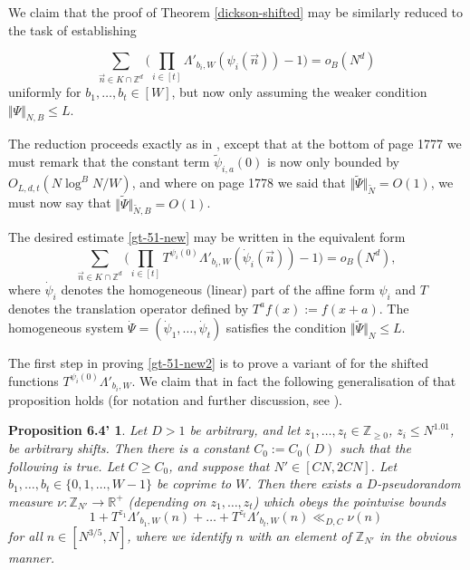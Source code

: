 \documentclass[12pt]{amsart}
\numberwithin{equation}{section}  %
\theoremstyle{remark}
\theoremstyle{plain}
\newtheorem*{prop64new}{Proposition 6.4'}
\numberwithin{equation}{section}
\newcommand{\Z}{\mathbb{Z}}
\newcommand{\R}{\mathbb{R}}
\renewcommand{\leq}{\leqslant}
\renewcommand{\geq}{\geqslant}
\renewcommand{\(}{\left(}
\renewcommand{\)}{\right)}
\newcommand{\vect}[1]{{\ensuremath{\vec{#1}}}}
\begin{document}
We claim that the proof of Theorem \ref{dickson-shifted} may be similarly reduced to the task of establishing 

\begin{equation}\label{gt-51-new} \sum_{\vect{n} \in K \cap \Z^d} \Bigg(\prod_{i \in [t]} \Lambda'_{b_i, W}(\psi_i(\vect{n})) - 1\Bigg) = o_B(N^d)\end{equation} uniformly for $b_1,\dots, b_t \in [W]$, but now only assuming the weaker condition $\Vert \Psi \Vert_{N, B} \leq L$.

The reduction proceeds exactly as in \cite[Chapter 5]{gt-linearprimes}, except that at the bottom of page 1777 we must remark that the constant term $\tilde\psi_{i,a}(0)$ is now only bounded by $O_{L,d,t}(N\log^B N/W)$, and where on page 1778 we said that $\Vert \tilde\Psi \Vert_{\tilde N} = O(1)$, we must now say that $\Vert \tilde\Psi \Vert_{\tilde N, B} = O(1)$.


The desired estimate \eqref{gt-51-new} may be written in the equivalent form
\begin{equation}\label{gt-51-new2} \sum_{\vect{n} \in K \cap \Z^d} \Bigg(\prod_{i \in [t]} T^{\psi_i(0)}\Lambda'_{b_i, W}(\dot\psi_i(\vect{n})) - 1\Bigg) = o_B(N^d),\end{equation} where $\dot\psi_i$ denotes the homogeneous (linear) part of the affine form $\psi_i$ and $T$ denotes the translation operator defined by $T^af(x) := f(x + a)$. The homogeneous system $\dot\Psi = (\dot\psi_1,\dots, \dot\psi_t)$ satisfies the condition $\Vert \tilde\Psi \Vert_N \leq L$.

The first step in proving \eqref{gt-51-new2} is to prove a variant of \cite[Proposition 6.4]{gt-linearprimes} for the shifted functions $T^{\psi_i(0)} \Lambda'_{b_i, W}$. We claim that in fact the following generalisation of that proposition holds (for notation and further discussion, see \cite[Chapter 6]{gt-linearprimes}).

\begin{prop64new}\label{shift-majorant}
Let $D > 1$ be arbitrary, and let $z_1,\dots, z_t \in \Z_{\geq 0}$, $z_i \leq N^{1.01}$, be arbitrary shifts. Then there is a constant $C_0 := C_0(D)$ such that the following is true. Let $C \geq C_0$, and suppose that $N' \in [CN,2CN]$. Let $b_1,\dots, b_t \in \{0,1,\dots, W-1\}$ be coprime to $W$. Then there exists a $D$-pseudorandom measure $\nu : \Z_{N'} \rightarrow \R^{+}$ \textup{(}depending on $z_1,\dots, z_t$\textup{)} which obeys the pointwise bounds
\[ 1 + T^{z_1}\Lambda'_{b_1, W}(n) + \dots + T^{z_t}\Lambda'_{b_t, W}(n) \ll_{D,C} \nu(n)\] for all $n \in [N^{3/5}, N]$, where we identify $n$ with an element of $\Z_{N'}$ in the obvious manner.
\end{prop64new}
\end{document}
